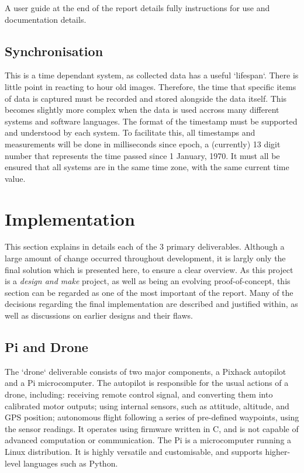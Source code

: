 \documentclass{article}
\begin{document}
A user guide at the end of the report details fully instructions for use and documentation details.

\subsection{Synchronisation}
This is a time dependant system, as collected data has a useful `lifespan`. There is little point in reacting to hour old images. Therefore, the time that specific items of data is captured must be recorded and stored alongside the data itself. This becomes slightly more complex when the data is used accross many different systems and software languages. The format of the timestamp must be supported and understood by each system. To facilitate this, all timestamps and measurements will be done in milliseconds since epoch, a (currently) 13 digit number that represents the time passed since 1 January, 1970. It must all be ensured that all systems are in the same time zone, with the same current time value.

\section{Implementation}
This section explains in details each of the 3 primary deliverables. Although a large amount of change occurred throughout development, it is largly only the final solution which is presented here, to ensure a clear overview. As this project is a \textit{design and make} project, as well as being an evolving proof-of-concept, this section can be regarded as one of the most important of the report. Many of the decisions regarding the final implementation are described and justified within, as well as discussions on earlier designs and their flaws. 
 
\subsection{Pi and Drone}
The `drone` deliverable consists of two major components, a Pixhack autopilot and a Pi microcomputer. The autopilot is responsible for the usual actions of a drone, including: receiving remote control signal, and converting them into calibrated motor outputs; using internal sensors, such as attitude, altitude, and GPS position; autonomous flight following a series of pre-defined waypoints, using the sensor readings. It operates using firmware written in C, and is not capable of advanced computation or communication. The Pi is a microcomputer running a Linux distribution. It is highly versatile and customisable, and supports higher-level languages such as Python. 
\end{document}
